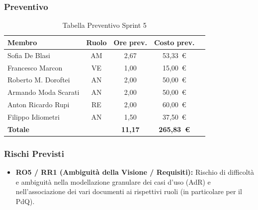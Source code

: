 \subsubsection{Preventivo}
\begin{table}[H]
    \centering
    \renewcommand{\arraystretch}{1.3}
    \begin{tabularx}{\textwidth}{|X|c|c|c|r|}
        \hline
        \textbf{Membro} & \textbf{Ruolo} & \textbf{Ore prev.} & \textbf{Costo prev.} \\
        \hline
        Sofia De Blasi           & AM & 2,67 & 53{,}33~\euro \\
        Francesco Marcon         & VE & 1,00 & 15{,}00~\euro \\
        Roberto M. Doroftei      & AN & 2,00 & 50{,}00~\euro \\
        Armando Moda Scarati     & AN & 2,00 & 50{,}00~\euro \\
        Anton Ricardo Rupi       & RE & 2,00 & 60{,}00~\euro \\
        Filippo Idiometri        & AN & 1,50 & 37{,}50~\euro \\
        \hline
        \textbf{Totale}          &    & \textbf{11,17} & \textbf{265{,}83~\euro} \\
        \hline
    \end{tabularx}
    \caption{Tabella Preventivo Sprint 5} 
\end{table}

\subsubsection{Rischi Previsti}
\begin{itemize}
    \item \textbf{RO5 / RR1 (Ambiguità della Visione / Requisiti):} Rischio di difficoltà e ambiguità nella modellazione granulare dei casi d'uso (AdR) e nell'associazione dei vari documenti ai rispettivi ruoli (in particolare per il PdQ).
\end{itemize}

